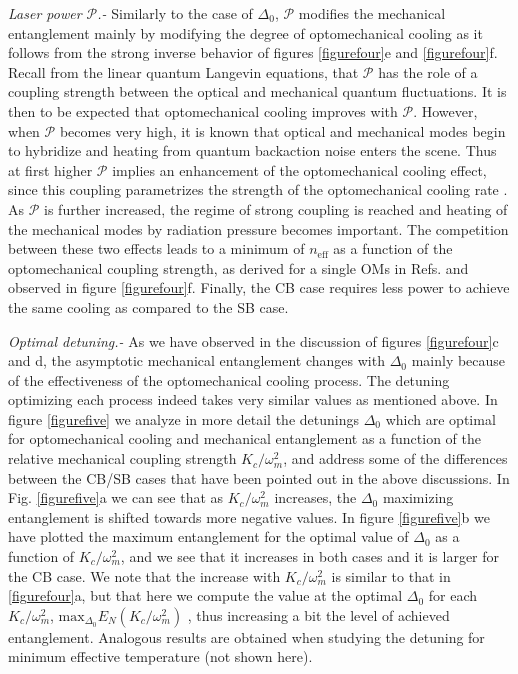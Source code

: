 \documentclass[a4paper]{jpconf}
\begin{document}
{\it Laser power $\mathcal{P}$.-}  Similarly to the case of $\Delta_0$, $\mathcal{P}$ modifies the mechanical entanglement  mainly by modifying 
the degree of optomechanical cooling  as it follows from the strong inverse behavior of figures \ref{figurefour}e and \ref{figurefour}f. Recall from the linear
quantum Langevin equations, that $\mathcal{P}$ has the role of a coupling strength between
the optical and mechanical quantum fluctuations. It is then to be expected that
optomechanical cooling improves with $\mathcal{P}$. However, when $\mathcal{P}$ becomes very 
high, it is known \cite{16,56} that optical and mechanical modes begin to hybridize and
heating from quantum backaction noise enters the 
scene. Thus at first higher $\mathcal{P}$ implies an enhancement of the optomechanical cooling effect,
 since this coupling parametrizes the strength of the optomechanical cooling rate \cite{15,16}. 
As $\mathcal{P}$ is further increased, the regime of strong coupling is reached and 
heating of the mechanical modes by radiation pressure becomes important. 
The competition between these two effects leads to a minimum of $n_{\mathrm{eff}}$ as a function of the optomechanical coupling strength,  as derived for a
single OMs in Refs. \cite{16,56} and observed in figure \ref{figurefour}f.
Finally, the CB case requires less power to achieve the same cooling as compared to the SB case.



{\it Optimal detuning.-}
 As we have observed in the discussion of figures \ref{figurefour}c and d, the asymptotic mechanical entanglement changes with $\Delta_0$ 
mainly because of the  
effectiveness of the optomechanical cooling process.
The detuning optimizing each process indeed takes very similar values as mentioned above.
In figure \ref{figurefive} we analyze in more detail the detunings $\Delta_0$ which are 
optimal for optomechanical cooling and mechanical entanglement as a function of the relative mechanical coupling 
strength $K_c/\omega_m^2$, and address some of the differences between the CB/SB cases that have been pointed out in the above discussions.
In Fig. \ref{figurefive}a we can see that as $K_c/\omega_m^2$ increases, the 
$\Delta_0$ maximizing entanglement is shifted towards more negative values. In figure \ref{figurefive}b
we have plotted the maximum entanglement for the optimal value of $\Delta_0$ as a 
function of $K_c/\omega_m^2$, and we see that it increases in both cases and it 
is larger for the CB case. We note that the increase with $K_c/\omega_m^2$ is similar to that in 
\ref{figurefour}a, but that here we compute the value at the optimal $\Delta_0$ for each $K_c/\omega_m^2$, $\textrm{max}_{\Delta_0}{ E_N(K_c/\omega_m^2)}$ , thus
increasing a bit the level of achieved entanglement.   Analogous results are obtained when studying the detuning for minimum effective temperature (not shown here).
\end{document}
